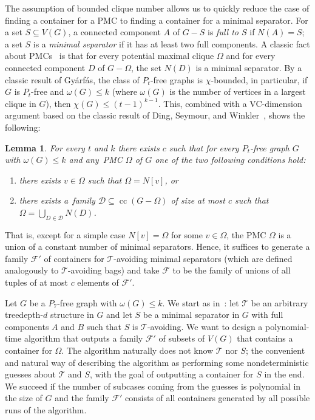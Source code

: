 \documentclass[11pt,a4paper]{article}
\DeclareMathOperator{\cc}{cc}
\newtheorem{lemma}[theorem]{Lemma}
\theoremstyle{definition}
\def\T{\mathcal{T}}
\begin{document}
The assumption of bounded clique number allows us to quickly reduce the case of finding a container for a PMC to finding a container for a minimal separator.
For a set $S \subseteq V(G)$, a connected component $A$ of $G-S$ is \emph{full to $S$} if $N(A) = S$; a set $S$ is a \emph{minimal separator} if 
it has at least two full components.
A classic fact about PMCs~\cite{Todinca} is that for every potential maximal clique $\Omega$ and for every connected component $D$
of $G-\Omega$, the set $N(D)$ is a minimal separator. 
By a classic result of Gy\'{a}rf\'{a}s, the class of $P_t$-free graphs is 
$\chi$-bounded, in particular, if $G$ is $P_t$-free and $\omega(G) \leq k$ (where $\omega(G)$ is the number of vertices in a largest clique in $G$),
 then $\chi(G) \leq (t-1)^{k-1}$. 
This, combined with a VC-dimension argument based on the classic result
of Ding, Seymour, and Winkler~\cite{DSW}, shows the following:
\begin{lemma}
    For every $t$ and $k$ there exists $c$ such that for every $P_t$-free graph $G$ with $\omega(G)\leq k$ and any~PMC $\Omega$ of $G$ one of the two following conditions hold:
    \begin{enumerate}
        \item there exists $v\in \Omega$ such that $\Omega = N[v]$, or
        \item there exists a~family $\mathcal{D}\subseteq \cc(G-\Omega)$ of size at most $c$ such that $\Omega=\bigcup_{D\in \mathcal{D}} N(D)$.
    \end{enumerate}
\end{lemma}
That is, except for a simple case $N[v] = \Omega$ for some $v \in \Omega$, 
the PMC $\Omega$ is a union of a constant number of minimal separators. 
Hence, it suffices to generate a family $\mathcal{F}'$ of containers for $\T$-avoiding
minimal separators (which are defined analogously to $\T$-avoiding bags) and take $\mathcal{F}$ to be the family of unions of all
tuples of at most $c$ elements of $\mathcal{F}'$. 

Let $G$ be a $P_7$-free graph with $\omega(G) \leq k$. 
We start as in~\cite{Tara,DBLP:conf/soda/ChudnovskyMPPR24}: let $\T$ be an arbitrary treedepth-$d$ structure in $G$ and let $S$ be a minimal separator in $G$ with full components $A$ and $B$
such that $S$ is $\T$-avoiding.
We want to design a polynomial-time algorithm that outputs a family $\mathcal{F}'$ of subsets of $V(G)$ that contains a container for $\Omega$.
The algorithm naturally does not know $\T$ nor $S$; the convenient and natural way of describing the algorithm as performing some nondeterministic 
guesses about $\T$ and $S$, with the goal of outputting a container for $S$ in the end. We succeed if the number of subcases coming from the guesses is
polynomial in the size of $G$ and the family $\mathcal{F}'$ consists of all containers generated by all possible runs of the algorithm. 
\end{document}
